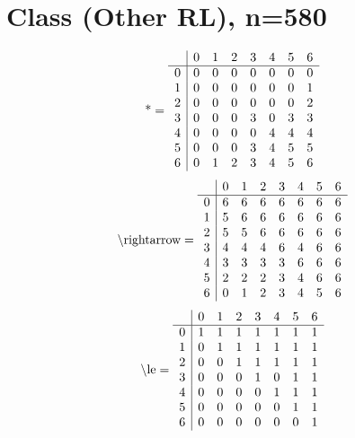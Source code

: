\documentclass[11pt]{article}
\begin{document}
\section{Class (Other RL), n=580}
\[\text{*} = 
\begin{array}{r | r r r r r r r}
 & 0 & 1 & 2 & 3 & 4 & 5 & 6 \\ \hline
0 & 0 & 0 & 0 & 0 & 0 & 0 & 0 \\
1 & 0 & 0 & 0 & 0 & 0 & 0 & 1 \\
2 & 0 & 0 & 0 & 0 & 0 & 0 & 2 \\
3 & 0 & 0 & 0 & 3 & 0 & 3 & 3 \\
4 & 0 & 0 & 0 & 0 & 4 & 4 & 4 \\
5 & 0 & 0 & 0 & 3 & 4 & 5 & 5 \\
6 & 0 & 1 & 2 & 3 & 4 & 5 & 6 \\
\end{array}
\]
\[\text{\textbackslash rightarrow} = 
\begin{array}{r | r r r r r r r}
 & 0 & 1 & 2 & 3 & 4 & 5 & 6 \\ \hline
0 & 6 & 6 & 6 & 6 & 6 & 6 & 6 \\
1 & 5 & 6 & 6 & 6 & 6 & 6 & 6 \\
2 & 5 & 5 & 6 & 6 & 6 & 6 & 6 \\
3 & 4 & 4 & 4 & 6 & 4 & 6 & 6 \\
4 & 3 & 3 & 3 & 3 & 6 & 6 & 6 \\
5 & 2 & 2 & 2 & 3 & 4 & 6 & 6 \\
6 & 0 & 1 & 2 & 3 & 4 & 5 & 6 \\
\end{array}
\]
\[\text{\textbackslash le} = 
\begin{array}{r | r r r r r r r}
 & 0 & 1 & 2 & 3 & 4 & 5 & 6 \\ \hline
0 & 1 & 1 & 1 & 1 & 1 & 1 & 1 \\
1 & 0 & 1 & 1 & 1 & 1 & 1 & 1 \\
2 & 0 & 0 & 1 & 1 & 1 & 1 & 1 \\
3 & 0 & 0 & 0 & 1 & 0 & 1 & 1 \\
4 & 0 & 0 & 0 & 0 & 1 & 1 & 1 \\
5 & 0 & 0 & 0 & 0 & 0 & 1 & 1 \\
6 & 0 & 0 & 0 & 0 & 0 & 0 & 1 \\
\end{array}
\]
\end{document}
